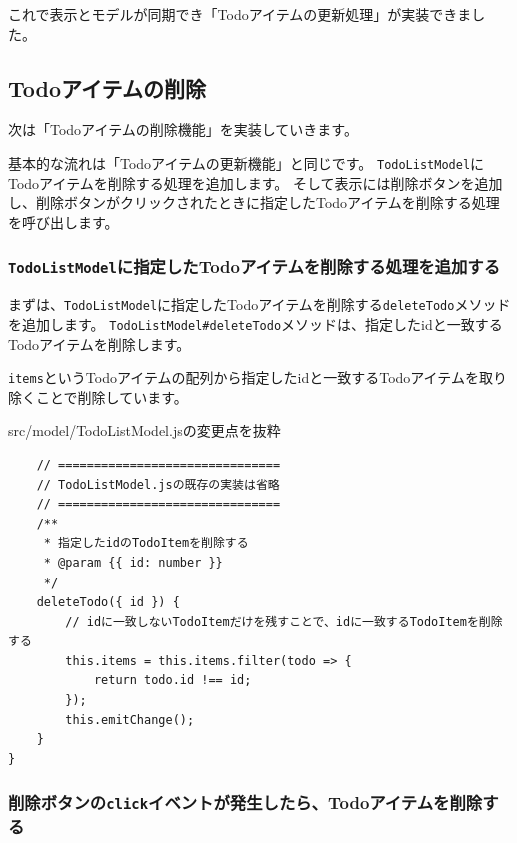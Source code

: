 これで表示とモデルが同期でき「Todoアイテムの更新処理」が実装できました。

\hypertarget{delete}{%
\subsection{Todoアイテムの削除}\label{delete}}

次は「Todoアイテムの削除機能」を実装していきます。

基本的な流れは「Todoアイテムの更新機能」と同じです。
\texttt{TodoListModel}にTodoアイテムを削除する処理を追加します。
そして表示には削除ボタンを追加し、削除ボタンがクリックされたときに指定したTodoアイテムを削除する処理を呼び出します。

\hypertarget{TodoListModel-deleteTodo}{%
\subsubsection{\texorpdfstring{\texttt{TodoListModel}に指定したTodoアイテムを削除する処理を追加する}{TodoListModelに指定したTodoアイテムを削除する処理を追加する}}\label{TodoListModel-deleteTodo}}

まずは、\texttt{TodoListModel}に指定したTodoアイテムを削除する\texttt{deleteTodo}メソッドを追加します。
\texttt{TodoListModel\#deleteTodo}メソッドは、指定したidと一致するTodoアイテムを削除します。

\texttt{items}というTodoアイテムの配列から指定したidと一致するTodoアイテムを取り除くことで削除しています。

\begin{listtitle}
src/model/TodoListModel.jsの変更点を抜粋
\end{listtitle}
\begin{lstlisting}
    // ===============================
    // TodoListModel.jsの既存の実装は省略
    // ===============================
    /**
     * 指定したidのTodoItemを削除する
     * @param {{ id: number }}
     */
    deleteTodo({ id }) {
        // idに一致しないTodoItemだけを残すことで、idに一致するTodoItemを削除する
        this.items = this.items.filter(todo => {
            return todo.id !== id;
        });
        this.emitChange();
    }
}
\end{lstlisting}
\listend

\hypertarget{onChange-update-model}{%
\subsubsection{\texorpdfstring{削除ボタンの\texttt{click}イベントが発生したら、Todoアイテムを削除する}{削除ボタンのclickイベントが発生したら、Todoアイテムを削除する}}\label{onChange-update-model}}

